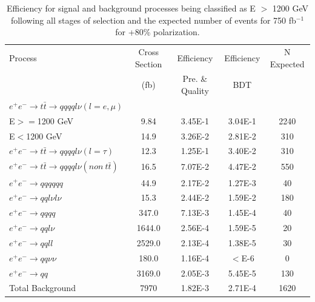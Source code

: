 \begin{table}
  \centering
  \begin{tabular}{l | c | c | c | c}
    \toprule
    Process     & Cross Section & Efficiency & Efficiency & N Expected\\
         & (fb) & Pre. \& Quality & BDT & \\
    \midrule
    $e^+e^-\rightarrow t\bar{t} \rightarrow qqqql\nu (l=e,\mu)$ &  & \\
    E$>=$1200 GeV & 9.84 & 3.45E-1 & 3.04E-1 & 2240\\
    E$<$1200 GeV & 14.9 & 3.26E-2 & 2.81E-2 & 310 \\
   \midrule
    $e^+e^-\rightarrow t\bar{t} \rightarrow qqqql\nu (l=\tau)$& 12.3 & 1.25E-1 & 3.40E-2 & 310\\
    \midrule
    $e^+e^-\rightarrow t\bar{t} \rightarrow qqqql\nu (non ~ t\bar{t})$& 16.5 & 7.07E-2 & 4.47E-2 & 550\\
    \midrule
    $e^+e^-\rightarrow qqqqqq$ & 44.9 & 2.17E-2 & 1.27E-3 & 40 \\
    \midrule
    $e^+e^-\rightarrow qql\nu l\nu$ & 15.3  & 2.44E-2 & 1.59E-2 & 180 \\
    \midrule
    $e^+e^-\rightarrow qqqq$ & 347.0 & 7.13E-3 & 1.45E-4 & 40 \\
    \midrule
    $e^+e^-\rightarrow qql\nu$ & 1644.0 & 2.56E-4 & 1.59E-5 & 20\\
    \midrule
    $e^+e^-\rightarrow qqll$ & 2529.0 & 2.13E-4 & 1.38E-5 & 30 \\
    \midrule
    $e^+e^-\rightarrow qq\nu\nu$ & 180.0 & 1.16E-4 & $<$E-6 & 0 \\
    \midrule
    $e^+e^-\rightarrow qq$ & 3169.0 & 2.05E-3 & 5.45E-5 & 130 \\
    \midrule
    \midrule
    Total Background & 7970 & 1.82E-3 & 2.71E-4 & 1620\\
    \bottomrule
  \end{tabular}
  \caption{Efficiency for signal and background processes being classified as E $>$ 1200 GeV following all stages of selection and the expected number of events for 750 fb$^{-1}$ for +80\% polarization.}
  \label{table:topfinalefficienciespos}
\end{table}

